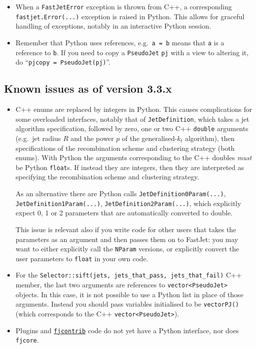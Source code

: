 \documentclass[12pt,a4]{article}
\newcommand{\fastjet}{\texttt{FastJet}\xspace}
\newcommand{\fjcontrib}{\texttt{\href{http://fastjet.hepforge.org/contrib/}{fjcontrib}}\xspace}
\newcommand{\fjcore}{\texttt{fjcore}\xspace}
\newcommand{\ttt}[1]{{\small\texttt{#1}}}
\begin{document}
\begin{itemize}
\item When a \fastjet \ttt{Error} exception is thrown from C++, a
  corresponding \ttt{fastjet.Error(...)} exception is raised in
  Python. 
  This allows for graceful handling of exceptions, notably in
  an interactive Python session.

\item Remember that Python uses references, e.g.\ \ttt{a = b} means
  that \ttt{a} is a reference to \ttt{b}. If you need to copy a
  \ttt{PseudoJet} \ttt{pj} with a view to altering it, do ``\ttt{pjcopy =
    PseudoJet(pj)}''.
\end{itemize}

\subsection{Known issues as of version 3.3.x}
\label{sec:python-issues}

\begin{itemize}
\item C++ enums are replaced by integers in Python. 
  This causes complications for some overloaded interfaces, notably
  that of \ttt{JetDefinition}, which takes a jet algorithm
  specification, followed by zero, one or two C++ \ttt{double} arguments
  (e.g.\ jet radius $R$ and the power $p$ of the generalised-$k_t$
  algorithm), then specifications of the recombination scheme and
  clustering strategy (both enums).
  With Python the arguments corresponding to the C++ doubles
  \emph{must} be Python \ttt{float}s.
  If instead they are integers, then they are interpreted as
  specifying the recombination scheme and clustering strategy.

  As an alternative there are Python calls \texttt{JetDefinition0Param(...)},
  \texttt{JetDefinition1Param(...)},
  \texttt{JetDefinition2Param(...)}, which explicitly expect 0, 1 or 2
  parameters that are automatically converted to double.

  This issue is relevant also if you write code for other users that
  takes the parameters as an argument and then passes them on to
  FastJet: you may want to either explicitly call the \ttt{NParam}
  versions, or explicitly convert the user parameters to \ttt{float}
  in your own code.

\item For the \ttt{Selector::sift(jets, jets\_that\_pass,
    jets\_that\_fail)} C++ member, the last two arguments are 
  references to \ttt{vector<PseudoJet>} objects.
  In this case, it is not possible to use a Python list in place of
  those arguments.
  Instead you should pass variables initialised to be \ttt{vectorPJ()}
  (which corresponds to the C++ \ttt{vector<PseudoJet>}).

\item Plugins and \fjcontrib code do not yet have a Python interface,
  nor does \fjcore.
\end{itemize}
\end{document}
